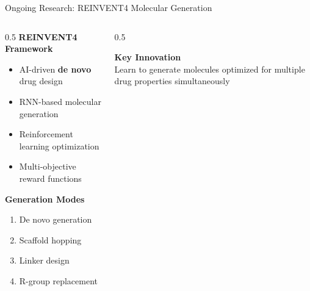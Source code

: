 \documentclass[aspectratio=169,xcolor=table]{beamer}
\begin{document}
\begin{frame}{Ongoing Research: REINVENT4 Molecular Generation}

\begin{columns}
\begin{column}{0.5\textwidth}
\textbf{REINVENT4 Framework}
\begin{itemize}\setlength{\itemsep}{2pt}
    \item AI-driven \textbf{de novo} drug design
    \item RNN-based molecular generation
    \item Reinforcement learning optimization
    \item Multi-objective reward functions
\end{itemize}

\vspace{0.3cm}

\textbf{Generation Modes}
\begin{enumerate}\setlength{\itemsep}{0pt}
    \item De novo generation
    \item Scaffold hopping
    \item Linker design
    \item R-group replacement
\end{enumerate}
\end{column}

\begin{column}{0.5\textwidth}
\begin{center}
\end{center}

\textbf{Key Innovation}\\
Learn to generate molecules optimized for multiple drug properties simultaneously
\end{column}
\end{columns}

\end{frame}
\end{document}
